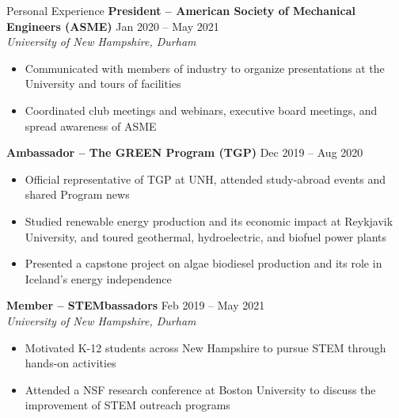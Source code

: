 \documentclass{resume}
\begin{document}
\begin{rSection}{Personal Experience}
    {\bf President -- American Society of Mechanical Engineers (ASME)} \hfill {Jan 2020 -- May 2021}
    \\ {\em University of New Hampshire, Durham}
    \vspace{-0.5em}
    \begin{itemize}[label={\tiny\raisebox{1ex}{\textbullet}}, noitemsep]
        \item Communicated with members of industry to organize presentations at the University and tours of facilities
        \item Coordinated club meetings and webinars, executive board meetings, and spread awareness of ASME
    \end{itemize}
    \vspace{-0.4em}
    {\bf Ambassador -- The GREEN Program (TGP)} \hfill {Dec 2019 -- Aug 2020}
    \vspace{-0.5em}
    \begin{itemize}[label={\tiny\raisebox{1ex}{\textbullet}}, noitemsep]
        \item Official representative of TGP at UNH, attended study-abroad events and shared Program news
        \item Studied renewable energy production and its economic impact at Reykjavik University, and toured geothermal, hydroelectric, and biofuel power plants
        \item Presented a capstone project on algae biodiesel production and its role in Iceland's energy independence
    \end{itemize}
    \vspace{-0.4em}
    {\bf Member -- STEMbassadors} \hfill {{Feb 2019 -- May 2021}}
    \\ {\em University of New Hampshire, Durham}
    \vspace{-0.5em}
    \begin{itemize}[label={\tiny\raisebox{1ex}{\textbullet}}, noitemsep]
        \item Motivated K-12 students across New Hampshire to pursue STEM through hands-on activities
        \item Attended a NSF research conference at Boston University to discuss the improvement of STEM outreach programs
    \end{itemize}
\end{rSection}
\end{document}
